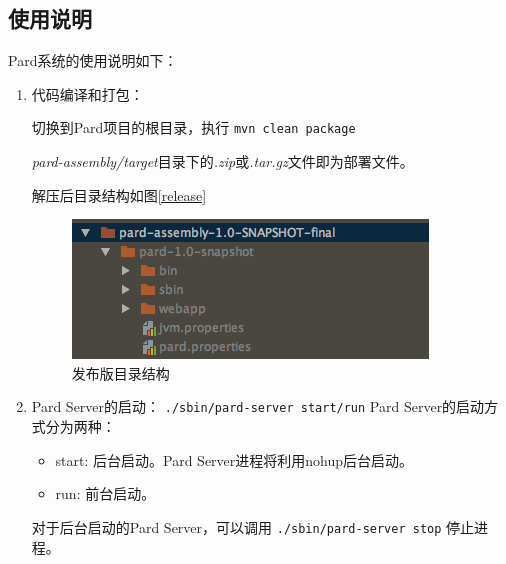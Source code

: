 \documentclass[a4paper, 12pt]{ctexart}
\begin{document}
\subsection{使用说明}
Pard系统的使用说明如下：
\begin{enumerate}
\item 代码编译和打包：

切换到Pard项目的根目录，执行
\lstinline[language=bash]|mvn clean package|

\textit{pard-assembly/target}目录下的\textit{.zip}或\textit{.tar.gz}文件即为部署文件。

解压后目录结构如图\ref{release}
\begin{figure}[htbp]
	\centering
	\includegraphics[width=\linewidth]{figure/release.png}
	\caption{发布版目录结构}
	\label{fig:release}
\end{figure}

\item Pard Server的启动：
\lstinline[language=bash]|./sbin/pard-server start/run|
Pard Server的启动方式分为两种：
\begin{itemize}
	\item start: 后台启动。Pard Server进程将利用nohup后台启动。
	\item run: 前台启动。
\end{itemize}
对于后台启动的Pard Server，可以调用
\lstinline[language=bash]|./sbin/pard-server stop|
停止进程。


\end{enumerate}
\end{document}

